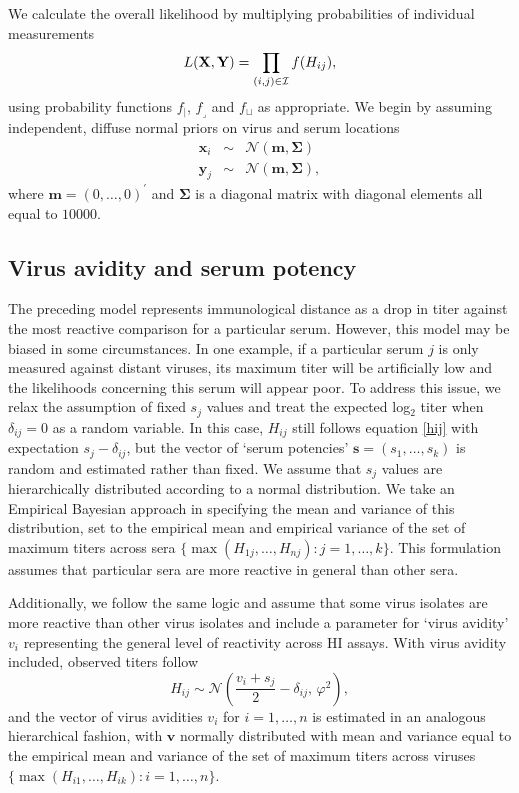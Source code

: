 \documentclass[11pt,oneside,letterpaper]{article}
\newcommand{\virus}{\mathbf{x}}						%
\newcommand{\serum}{\mathbf{y}}						%
\newcommand{\viruses}{\mathbf{X}}					%
\newcommand{\sera}{\mathbf{Y}}						%
\newcommand{\ve}{v}									%
\newcommand{\se}{s}									%
\newcommand{\ves}{\mathbf{v}}						%
\newcommand{\ses}{\mathbf{s}}						%
\newcommand{\point}{f_{\scriptscriptstyle \vert}}	%
\newcommand{\threshold}{f_{\textstyle \lrcorner}}	%
\newcommand{\interval}{f_{\sqcup}}					%
\newcommand{\mdssd}{\varphi}						%
\newcommand{\vn}{n}									%
\newcommand{\sn}{k}									%
\newcommand{\normal}{\mathcal{N}}					%
\begin{document}
We calculate the overall likelihood by multiplying probabilities of individual measurements
\begin{equation}  \label{bmds}
	L(\viruses,\sera) = \prod_{(i,j) \in \cal I} f(H_{ij}),
\end{equation}
using probability functions $\point$, $\threshold$ and $\interval$ as appropriate.
We begin by assuming independent, diffuse normal priors on virus and serum locations
\begin{eqnarray}
	\virus_i &\sim& \normal(\mathbf{m},\boldsymbol{\Sigma}) \nonumber \\
	\serum_j &\sim& \normal(\mathbf{m},\boldsymbol{\Sigma}),
\end{eqnarray}
where $\mathbf{m} = (0,\ldots,0)^{\prime}$ and $\boldsymbol{\Sigma}$ is a diagonal matrix with diagonal elements all equal to $10000$.

\subsection*{Virus avidity and serum potency}

The preceding model represents immunological distance as a drop in titer against the most reactive comparison for a particular serum.
However, this model may be biased in some circumstances.
In one example, if a particular serum $j$ is only measured against distant viruses, its maximum titer will be artificially low and the likelihoods concerning this serum will appear poor. 
To address this issue, we relax the assumption of fixed $\se_j$ values and treat the expected log$_2$ titer when $\delta_{ij}=0$ as a random variable.
In this case, $H_{ij}$ still follows equation \ref{hij} with expectation $\se_j - \delta_{ij}$, but the vector of `serum potencies' $\ses = (\se_1,\ldots,\se_{\sn})$ is random and estimated rather than fixed.
We assume that $\se_j$ values are hierarchically distributed according to a normal distribution.   
We take an Empirical Bayesian approach in specifying the mean and variance of this distribution, set to the empirical mean and empirical variance of the set of maximum titers across sera $\{ \max ( H_{1j},\ldots,H_{\vn j} ) : j = 1,\ldots,\sn \}$.
This formulation assumes that particular sera are more reactive in general than other sera.

Additionally, we follow the same logic and assume that some virus isolates are more reactive than other virus isolates and include a parameter for `virus avidity' $\ve_i$ representing the general level of reactivity across HI assays. 
With virus avidity included, observed titers follow
\begin{equation}
	H_{ij} \sim \normal \left( \frac{\ve_i+\se_j}{2} - \delta_{ij}, \, \mdssd^2 \right),
\end{equation}
and the vector of virus avidities $\ve_i$ for $i = 1,\ldots, \vn$ is estimated in an analogous hierarchical fashion, with $\ves$ normally distributed with mean and variance equal to the empirical mean and variance of the set of maximum titers across viruses $\{ \max ( H_{i1},\ldots,H_{i \sn} ) : i = 1,\ldots,\vn \}$.
\end{document}
